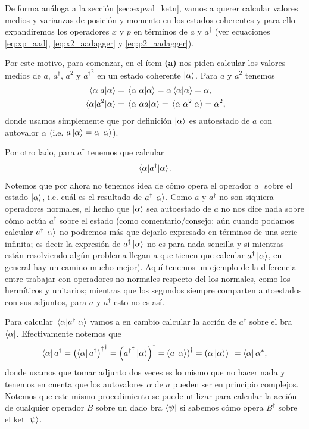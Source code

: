 \documentclass[10pt, a4paper]{article}
\numberwithin{equation}{subsection}
\begin{document}
De forma análoga a la sección \ref{sec:expval_ketn}, vamos a querer calcular
valores medios y varianzas de posición y momento en los estados coherentes y
para ello expandiremos los operadores $x$ y $p$ en términos de $a$ y
$a^\dagger$ (ver ecuaciones \eqref{eq:xp_aad}, \eqref{eq:x2_aadagger} y
\eqref{eq:p2_aadagger}).

Por este motivo, para comenzar, en el ítem \textbf{(a)} nos piden calcular los
valores medios de $a$, $a^\dagger$, $a^2$ y ${a^\dagger}^2$ en un estado
coherente $\ket{\alpha}$. Para $a$ y $a^2$ tenemos
\begin{align}
  \expval{a}{\alpha} &= \expval{\alpha}{\alpha} = \alpha\braket{\alpha}{\alpha}
    = \alpha, \label{eq:expval_a_alpha} \\
  \expval{a^2}{\alpha} &= \expval{\alpha a}{\alpha} = \expval{\alpha^2}{\alpha}
    = \alpha^2, \label{eq:expval_a2_alpha}
\end{align}
donde usamos simplemente que por definición $\ket{\alpha}$ es autoestado de $a$
con autovalor $\alpha$ (i.e. $a\ket{\alpha} = \alpha\ket{\alpha}$).

Por otro lado, para $a^\dagger$ tenemos que calcular
\begin{equation}
  \expval{a^\dagger}{\alpha}.
\end{equation}
Notemos que por ahora no tenemos idea de cómo opera el operador $a^\dagger$
sobre el estado $\ket{\alpha}$, i.e. cuál es el resultado de
$a^\dagger\ket{\alpha}$. Como $a$ y $a^\dagger$ no son siquiera operadores
normales, el hecho que $\ket{\alpha}$ sea autoestado de $a$ no nos dice nada
sobre cómo actúa $a^\dagger$ sobre el estado (como comentario/consejo: aún
cuando podamos calcular $a^\dagger\ket{\alpha}$ no podremos más que dejarlo
expresado en términos de una serie infinita; es decir la expresión de
$a^\dagger\ket{\alpha}$ no es para nada sencilla y si mientras están
resolviendo algún problema llegan a que tienen que calcular
$a^\dagger\ket{\alpha}$, en general hay un camino mucho mejor). Aquí tenemos un
ejemplo de la diferencia entre trabajar con operadores no normales respecto del
los normales, como los hermíticos y unitarios; mientras que los segundos
siempre comparten autoestados con sus adjuntos, para $a$ y $a^\dagger$ esto no
es así.

Para calcular $\expval{a^\dagger}{\alpha}$ vamos a en cambio calcular la acción
de $a^\dagger$ sobre el bra $\bra{\alpha}$. Efectivamente notemos que
\begin{equation}
  \bra{\alpha}a^\dagger = {\left(\bra{\alpha}a^\dagger\right)^\dagger}^\dagger
    = \left({a^\dagger}^\dagger\ket{\alpha}\right)^\dagger =
    \left(a\ket{\alpha}\right)^\dagger =
    \left(\alpha\ket{\alpha}\right)^\dagger = \bra{\alpha}{{\alpha}^{*}},
\end{equation}
donde usamos que tomar adjunto dos veces es lo mismo que no hacer nada y
tenemos en cuenta que los autovalores $\alpha$ de $a$ pueden ser en principio
complejos. Notemos que este mismo procedimiento se puede utilizar para calcular
la acción de cualquier operador $B$ sobre un dado bra $\bra{\psi}$ si sabemos
cómo opera $B^\dagger$ sobre el ket $\ket{\psi}$.
\end{document}
